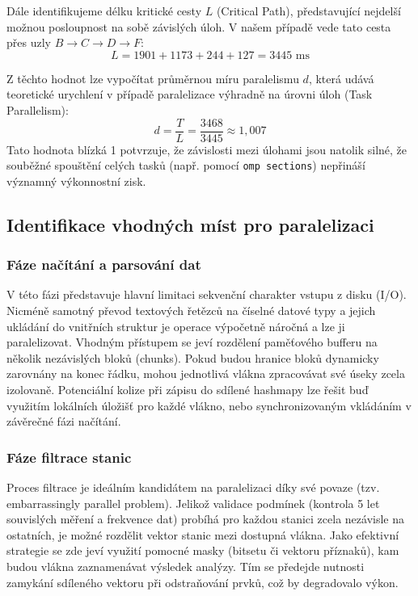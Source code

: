 \documentclass[10pt, a4paper]{report}
\begin{document}
	Dále identifikujeme délku kritické cesty $L$ (Critical Path), představující nejdelší možnou posloupnost na sobě závislých úloh. V našem případě vede tato cesta přes uzly $B \to C \to D \to F$:
	\begin{equation}
		L = 1901 + 1173 + 244 + 127 = 3445 \text{ ms}
	\end{equation}
	
	Z těchto hodnot lze vypočítat průměrnou míru paralelismu $d$, která udává teoretické urychlení v případě paralelizace výhradně na úrovni úloh (Task Parallelism):
	\begin{equation}
		d = \frac{T}{L} = \frac{3468}{3445} \approx 1,007 \text{}
	\end{equation}
	Tato hodnota blízká 1 potvrzuje, že závislosti mezi úlohami jsou natolik silné, že souběžné spouštění celých tasků (např. pomocí \texttt{omp sections}) nepřináší významný výkonnostní zisk.
	
	\subsection{Identifikace vhodných míst pro paralelizaci}
	\subsubsection*{Fáze načítání a parsování dat}
	V této fázi představuje hlavní limitaci sekvenční charakter vstupu z disku (I/O). Nicméně samotný převod textových řetězců na číselné datové typy a jejich ukládání do vnitřních struktur je operace výpočetně náročná a lze ji paralelizovat. Vhodným přístupem se jeví rozdělení paměťového bufferu na několik nezávislých bloků (chunks). Pokud budou hranice bloků dynamicky zarovnány na konec řádku, mohou jednotlivá vlákna zpracovávat své úseky zcela izolovaně. Potenciální kolize při zápisu do sdílené hashmapy lze řešit buď využitím lokálních úložišť pro každé vlákno, nebo synchronizovaným vkládáním v závěrečné fázi načítání.
	
	\subsubsection*{Fáze filtrace stanic}
	Proces filtrace je ideálním kandidátem na paralelizaci díky své povaze (tzv. embarrassingly parallel problem). Jelikož validace podmínek (kontrola 5 let souvislých měření a frekvence dat) probíhá pro každou stanici zcela nezávisle na ostatních, je možné rozdělit vektor stanic mezi dostupná vlákna. Jako efektivní strategie se zde jeví využití pomocné masky (bitsetu či vektoru příznaků), kam budou vlákna zaznamenávat výsledek analýzy. Tím se předejde nutnosti zamykání sdíleného vektoru při odstraňování prvků, což by degradovalo výkon.
	
\end{document}
